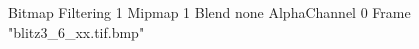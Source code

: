{Bitmap
	{Filtering 1}
	{Mipmap 1}
	{Blend none}
	{AlphaChannel 0}
	{Frame "blitz3_6_xx.tif.bmp"}
}
